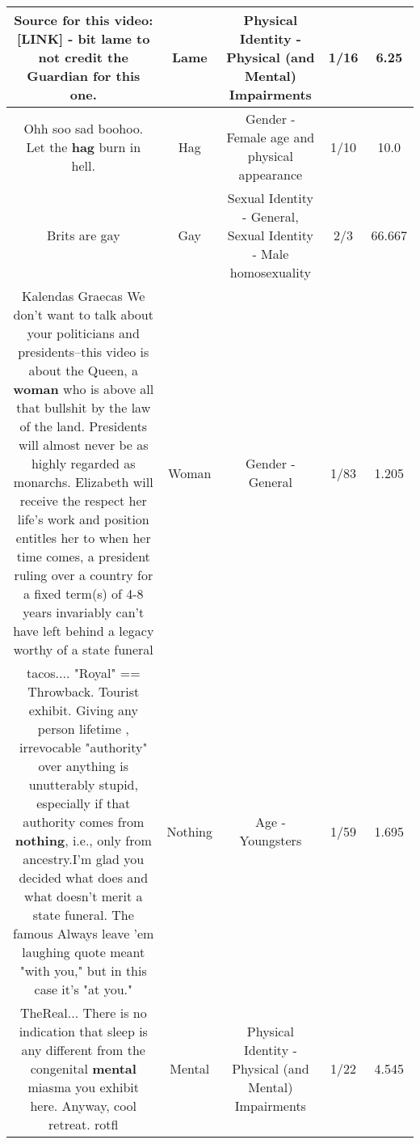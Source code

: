 \documentclass[11pt]{article}
\newlength\mylength
\begin{document}
\begin{center}
\begin{longtable}{|C{.65\mylength}|C{.30\mylength}|C{.12\mylength}|C{.12\mylength}|C{.12\mylength}|}
  \small Source for this video:  [LINK]  - bit \textbf{lame} to not credit the Guardian for this one.\normalsize   & Lame & Physical Identity - Physical (and Mental) Impairments & 1/16 & 6.25 \\  \hline
  \small Ohh soo sad boohoo. Let the \textbf{hag} burn in hell.\normalsize   & Hag & Gender - Female age and physical appearance & 1/10 & 10.0 \\  \hline
  \small Brits are gay\normalsize   & Gay & Sexual Identity - General, Sexual Identity - Male homosexuality & 2/3 & 66.667 \\  \hline
  \small Kalendas Graecas We don't want to talk about your politicians and presidents--this video is about the Queen, a \textbf{woman} who is above all that bullshit by the law of the land. Presidents will almost never be as highly regarded as monarchs. Elizabeth will receive the respect her life's work and position entitles her to when her time comes, a president ruling over a country for a fixed term(s) of 4-8 years invariably can't have left behind a legacy worthy of a state funeral\normalsize   & Woman & Gender - General & 1/83 & 1.205 \\  \hline
  \small tacos....  "Royal" == Throwback.    Tourist exhibit.    Giving any person lifetime , irrevocable "authority" over anything is unutterably stupid, especially if that authority comes from \textbf{nothing}, i.e., only from ancestry.I'm glad you decided what does and what doesn't merit a state funeral.  The famous Always leave 'em laughing quote meant "with you," but in this case it's "at you."\normalsize   & Nothing & Age - Youngsters & 1/59 & 1.695 \\  \hline
  \small TheReal...  There is no indication that sleep is any different from the congenital \textbf{mental} miasma you exhibit here.  Anyway, cool retreat. rotfl\normalsize   & Mental & Physical Identity - Physical (and Mental) Impairments & 1/22 & 4.545 \\  \hline

\end{longtable}
\end{center}
\end{document}
